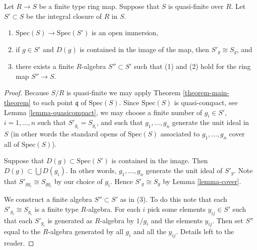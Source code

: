 \begin{lemma}
\label{lemma-quasi-finite-open-integral-closure}
Let $R \to S$ be a finite type ring map.
Suppose that $S$ is quasi-finite over $R$.
Let $S' \subset S$ be the integral closure of
$R$ in $S$.
\begin{enumerate}
\item $\text{Spec}(S) \to \text{Spec}(S')$ is
an open immersion,
\item if $g \in S'$ and $D(g)$ is contained in the image
of the map, then $S'_g \cong S_g$, and
\item there exists a finite $R$-algebra $S'' \subset S'$
such that (1) and (2) hold for the ring map
$S'' \to S$.
\end{enumerate}
\end{lemma}

\begin{proof}
Because $S/R$ is quasi-finite we may apply
Theorem \ref{theorem-main-theorem} to
each point $\mathfrak q$ of $\text{Spec}(S)$.
Since $\text{Spec}(S)$ is quasi-compact, see
Lemma \ref{lemma-quasicompact}, we may choose
a finite number of $g_i \in S'$, $i=1,\ldots,n$
such that $S'_{g_i} = S_{g_i}$, and such that
$g_1,\ldots,g_n$ generate the unit ideal in $S$
(in other words the standard opens of $\text{Spec}(S)$ associated
to $g_1,\ldots,g_n$ cover all of $\text{Spec}(S)$).

\medskip\noindent
Suppose that $D(g) \subset \text{Spec}(S')$
is contained in the image. Then $D(g) \subset \bigcup D(g_i)$.
In other words, $g_1,\ldots,g_n$ generate the unit ideal of
$S'_g$. Note that $S'_{gg_i} \cong S_{gg_i}$ by our choice
of $g_i$. Hence $S'_g \cong S_g$ by Lemma \ref{lemma-cover}.

\medskip\noindent
We construct a finite algebra $S'' \subset S'$ as
in (3). To do this note that each $S'_{g_i} \cong S_{g_i}$ 
is a finite type $R$-algebra. For each $i$ pick
some elements $y_{ij} \in S'$ such that each
$S'_{g_i}$ is generated as $R$-algebra by $1/g_i$
and the elements $y_{ij}$. Then set $S''$
equal to the $R$-algebra generated by all $g_i$
and all the $y_{ij}$. Details left to the reader.
\end{proof}








































